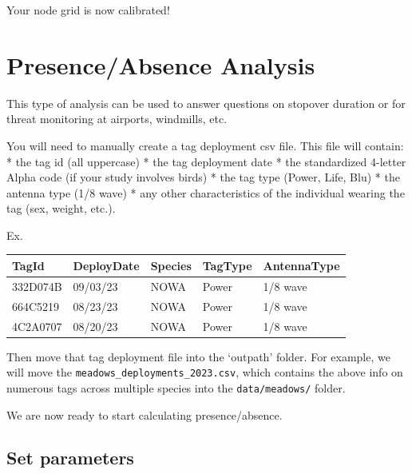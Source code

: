 \documentclass[
]{book}
\begin{document}
Your node grid is now calibrated!

\chapter{Presence/Absence Analysis}\label{presenceabsence-analysis}

This type of analysis can be used to answer questions on stopover duration or for threat monitoring at airports, windmills, etc.

You will need to manually create a tag deployment csv file. This file will contain:
* the tag id (all uppercase)
* the tag deployment date
* the standardized 4-letter Alpha code (if your study involves birds)
* the tag type (Power, Life, Blu)
* the antenna type (1/8 wave)
* any other characteristics of the individual wearing the tag (sex, weight, etc.).

Ex.

\begin{longtable}[]{@{}lllll@{}}
\toprule\noalign{}
TagId & DeployDate & Species & TagType & AntennaType \\
\midrule\noalign{}
\endhead
\bottomrule\noalign{}
\endlastfoot
332D074B & 09/03/23 & NOWA & Power & 1/8 wave \\
664C5219 & 08/23/23 & NOWA & Power & 1/8 wave \\
4C2A0707 & 08/20/23 & NOWA & Power & 1/8 wave \\
\end{longtable}

Then move that tag deployment file into the `outpath' folder. For example, we will move the \texttt{meadows\_deployments\_2023.csv}, which contains the above info on numerous tags across multiple species into the \texttt{data/meadows/} folder.

We are now ready to start calculating presence/absence.

\section{Set parameters}\label{set-parameters}
\end{document}
